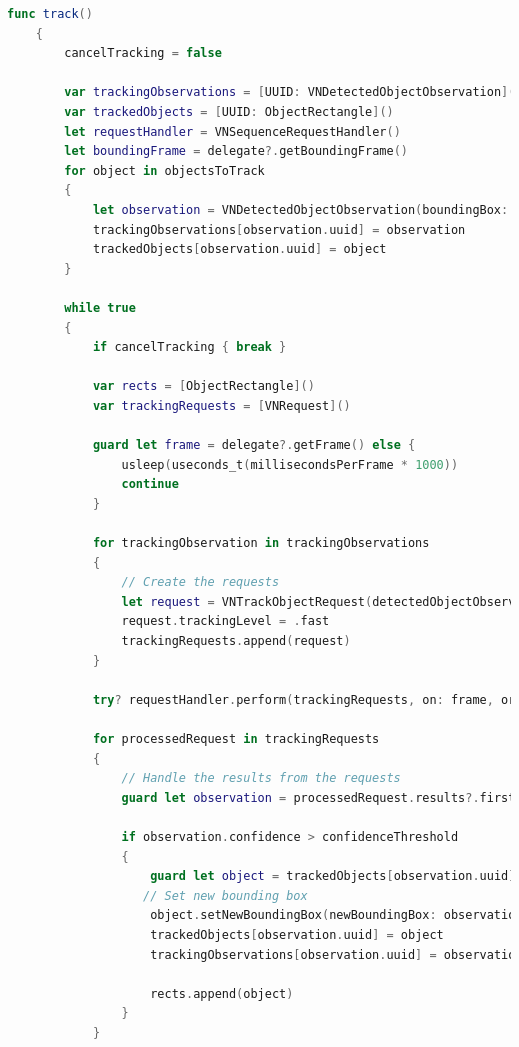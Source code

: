 \begin{lstlisting}[language=swift]
func track()
    {
        cancelTracking = false
        
        var trackingObservations = [UUID: VNDetectedObjectObservation]()
        var trackedObjects = [UUID: ObjectRectangle]()
        let requestHandler = VNSequenceRequestHandler()
        let boundingFrame = delegate?.getBoundingFrame()
        for object in objectsToTrack
        {
            let observation = VNDetectedObjectObservation(boundingBox: object.getNormalizedRect(frame: viewFrame))
            trackingObservations[observation.uuid] = observation
            trackedObjects[observation.uuid] = object
        }
        
        while true
        {
            if cancelTracking { break }
            
            var rects = [ObjectRectangle]()
            var trackingRequests = [VNRequest]()
            
            guard let frame = delegate?.getFrame() else {
                usleep(useconds_t(millisecondsPerFrame * 1000))
                continue
            }
            
            for trackingObservation in trackingObservations
            {
                // Create the requests
                let request = VNTrackObjectRequest(detectedObjectObservation: trackingObservation.value)
                request.trackingLevel = .fast
                trackingRequests.append(request)
            }

            try? requestHandler.perform(trackingRequests, on: frame, orientation: CGImagePropertyOrientation.up)

            for processedRequest in trackingRequests
            {
                // Handle the results from the requests
                guard let observation = processedRequest.results?.first as? VNDetectedObjectObservation else { continue }
                
                if observation.confidence > confidenceThreshold
                {
                    guard let object = trackedObjects[observation.uuid] else { continue }
                   // Set new bounding box
                    object.setNewBoundingBox(newBoundingBox: observation.boundingBox, frame: boundingFrame)
                    trackedObjects[observation.uuid] = object
                    trackingObservations[observation.uuid] = observation
                    
                    rects.append(object)
                }
            }


\end{lstlisting}
